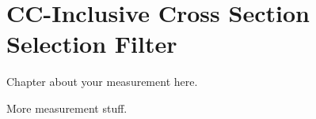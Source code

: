 \chapter{CC-Inclusive Cross Section Selection Filter} \label{ch:meas}
Chapter about your measurement here.

\clearpage
More measurement stuff.
